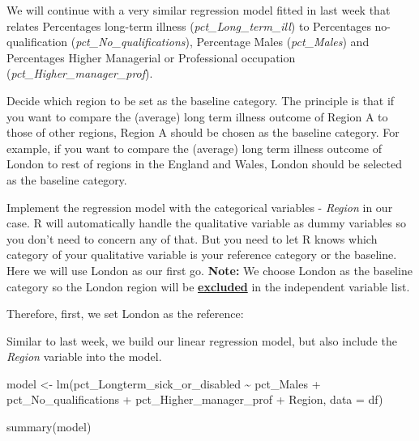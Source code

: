\documentclass[
  letterpaper,
  DIV=11,
  numbers=noendperiod]{scrreprt}
\newenvironment{Shaded}{\begin{snugshade}}{\end{snugshade}}
\newcommand{\AttributeTok}[1]{\textcolor[rgb]{0.40,0.45,0.13}{#1}}
\newcommand{\FunctionTok}[1]{\textcolor[rgb]{0.28,0.35,0.67}{#1}}
\newcommand{\NormalTok}[1]{\textcolor[rgb]{0.00,0.23,0.31}{#1}}
\newcommand{\OtherTok}[1]{\textcolor[rgb]{0.00,0.23,0.31}{#1}}
\newcommand{\SpecialCharTok}[1]{\textcolor[rgb]{0.37,0.37,0.37}{#1}}
\newcommand{\StringTok}[1]{\textcolor[rgb]{0.13,0.47,0.30}{#1}}
\begin{document}
We will continue with a very similar regression model fitted in last
week that relates Percentages long-term illness
(\emph{pct\_Long\_term\_ill}) to Percentages no-qualification
(\emph{pct\_No\_qualifications}), Percentage Males (\emph{pct\_Males})
and Percentages Higher Managerial or Professional occupation
(\emph{pct\_Higher\_manager\_prof}).

Decide which region to be set as the baseline category. The principle is
that if you want to compare the (average) long term illness outcome of
Region A to those of other regions, Region A should be chosen as the
baseline category. For example, if you want to compare the (average)
long term illness outcome of London to rest of regions in the England
and Wales, London should be selected as the baseline category.

Implement the regression model with the categorical variables -
\emph{Region} in our case. R will automatically handle the qualitative
variable as dummy variables so you don't need to concern any of that.
But you need to let R knows which category of your qualitative variable
is your reference category or the baseline. Here we will use London as
our first go. \textbf{Note:} We choose London as the baseline category
so the London region will be \ul{\textbf{excluded}} in the independent
variable list.

Therefore, first, we set London as the reference:

\begin{Shaded}
\end{Shaded}

Similar to last week, we build our linear regression model, but also
include the \emph{Region} variable into the model.

\begin{Shaded}
\begin{Highlighting}[]
\NormalTok{model }\OtherTok{\textless{}{-}} \FunctionTok{lm}\NormalTok{(pct\_Longterm\_sick\_or\_disabled }\SpecialCharTok{\textasciitilde{}}\NormalTok{ pct\_Males }\SpecialCharTok{+}\NormalTok{ pct\_No\_qualifications }\SpecialCharTok{+}\NormalTok{ pct\_Higher\_manager\_prof }\SpecialCharTok{+}\NormalTok{ Region, }\AttributeTok{data =}\NormalTok{ df)}

\FunctionTok{summary}\NormalTok{(model)}
\end{Highlighting}
\end{Shaded}
\end{document}
